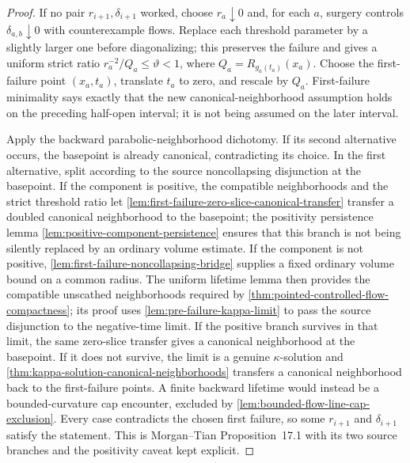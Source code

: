 \begin{proof}
If no pair $r_{i+1},\delta_{i+1}$ worked, choose
$r_a\downarrow0$ and, for each $a$, surgery controls
$\delta_{a,b}\downarrow0$ with counterexample flows.  Replace each threshold
parameter by a slightly larger one before diagonalizing; this preserves the
failure and gives a uniform strict ratio
$r_a^{-2}/Q_a\le\vartheta<1$, where
$Q_a=R_{g_a(t_a)}(x_a)$.  Choose the first-failure point $(x_a,t_a)$, translate
$t_a$ to zero, and rescale by $Q_a$.  First-failure minimality says exactly
that the new canonical-neighborhood assumption holds on the preceding
half-open interval; it is not being assumed on the later interval.

Apply the backward parabolic-neighborhood dichotomy.  If its second
alternative occurs, the basepoint is already canonical, contradicting its
choice.  In the first alternative, split according to the source
noncollapsing disjunction at the basepoint.  If the component is positive,
the compatible neighborhoods and the strict threshold ratio let
\ref{lem:first-failure-zero-slice-canonical-transfer} transfer a doubled
canonical neighborhood to the basepoint; the positivity persistence lemma
\ref{lem:positive-component-persistence} ensures that this branch is not being
silently replaced by an ordinary volume estimate.  If the component is not
positive, \ref{lem:first-failure-noncollapsing-bridge} supplies a fixed
ordinary volume bound on a common radius.  The uniform lifetime lemma then
provides the compatible unscathed neighborhoods required by
\ref{thm:pointed-controlled-flow-compactness}; its proof uses
\ref{lem:pre-failure-kappa-limit} to pass the source disjunction to the
negative-time limit.  If the positive branch survives in that limit, the same
zero-slice transfer gives a canonical neighborhood at the basepoint.  If it
does not survive, the limit is a genuine \(\kappa\)-solution and
\ref{thm:kappa-solution-canonical-neighborhoods} transfers a canonical
neighborhood back to the first-failure points.  A finite backward lifetime
would instead be a bounded-curvature cap encounter, excluded by
\ref{lem:bounded-flow-line-cap-exclusion}.  Every case contradicts the
chosen first failure, so some $r_{i+1}$ and $\delta_{i+1}$ satisfy the
statement.  This is Morgan--Tian Proposition~17.1 with its two source
branches and the positivity caveat kept explicit.
\end{proof}

